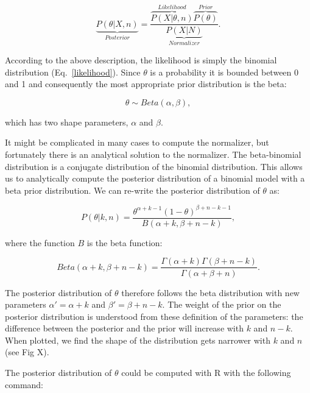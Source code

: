 \documentclass[12pt]{article}
\begin{document}
  \begin{equation}
    \underbrace{P(\theta|X,n)}_{Posterior} = \frac{\overbrace{P(X|\theta,n)}^{Likelihood}\overbrace{P(\theta)}^{Prior}}{\underbrace{P(X|N)}_{Normalizer}} .
    \label{posterior}
  \end{equation}

  According to the above description, the likelihood is simply the binomial distribution (Eq.~\ref{likelihood}). Since $\theta$ is a probability it is bounded between 0 and 1 and consequently the most appropriate prior distribution is the beta:

    \begin{equation}
      \theta \sim Beta(\alpha,\beta) , \label{prior}
    \end{equation}


  \noindent which has two shape parameters, $\alpha$ and $\beta$. 


  It might be complicated in many cases to compute the normalizer, but fortunately there is an analytical solution to the normalizer. The beta-binomial distribution is a conjugate distribution of the binomial distribution. This allows us to analytically compute the posterior distribution of a binomial model with a beta prior distribution. We can re-write the posterior distribution of $\theta$ as:


  \begin{equation}
    P(\theta|k,n) = \frac{\theta^{\alpha+k-1}(1-\theta)^{\beta+n-k-1}}{B(\alpha+k,\beta+n-k)} , \label{posterior}
  \end{equation}

  \noindent where the function $B$ is the beta function:

  \begin{equation}
    Beta(\alpha+k,\beta+n-k) = \frac{\Gamma(\alpha+k)\Gamma(\beta+n-k)}{\Gamma(\alpha+\beta+n)} . \label{betafunction}
  \end{equation}

  The posterior distribution of $\theta$ therefore follows the beta distribution with new parameters $\alpha'= \alpha+k$ and $\beta'=\beta+n-k$. The weight of the prior on the posterior distribution is understood from these definition of the parameters: the difference between the posterior and the prior will increase with $k$ and $n-k$. When plotted, we find the shape of the distribution gets narrower with $k$ and $n$ (see Fig X). 


  The posterior distribution of $\theta$ could be computed with R with the following command:
\end{document}

